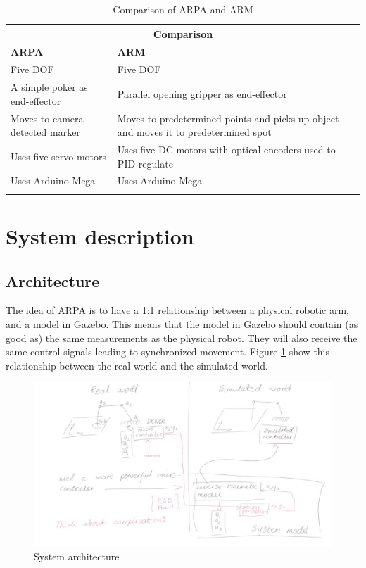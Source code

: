 \documentclass[11pt,a4paper, titlepage]{article}
\begin{document}
\begin{center}           
    \begin{longtable}{| p{8cm} | p{8cm} |}
              \hline
                       
\multicolumn{2}{|c|}{\textbf{Comparison}} \\ \hline \endhead
\textbf{ARPA} & \textbf{ARM}  \\ \hline             
                Five DOF & Five DOF  \\ \hline
                A simple poker as end-effector & Parallel opening gripper as end-effector  \\ \hline
               Moves to camera detected marker & Moves to predetermined points and picks up object and moves it to predetermined spot  \\ \hline
                Uses five servo motors  & Uses five DC motors with optical encoders used to PID regulate  \\ \hline
                Uses Arduino Mega & Uses Arduino Mega   \\ \hline
               
\caption{Comparison of ARPA and ARM}
\label{comp-table2}                                       
\end{longtable}
\end{center}






\newpage
\section{System description}
\label{description}
	

\subsection{Architecture}
The idea of ARPA is to have a 1:1 relationship between a physical robotic arm, and a model in Gazebo. This means that the model in Gazebo should contain (as good as) the same measurements as the physical robot. They will also receive the same control signals leading to synchronized movement. Figure \ref{fig:architecture} show this relationship between the real world and the simulated world.
	
	\begin{figure}[H]
		\includegraphics[width=\linewidth]{../Diagrams/Architecture.png}
		\caption{System architecture}
		\label{fig:architecture}
	\end{figure}
	
\end{document}
